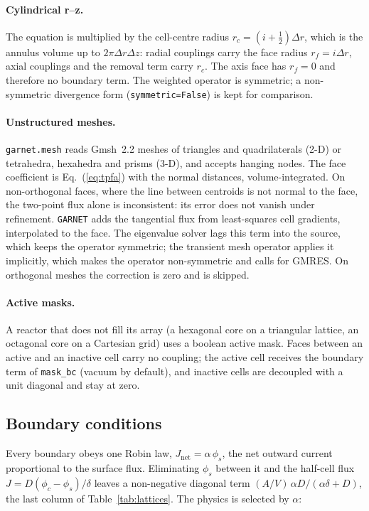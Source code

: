 \documentclass[a4paper,10pt]{article}
\newcommand{\garnet}{\texttt{GARNET}}
\newcommand{\code}[1]{\texttt{#1}}
\begin{document}
\paragraph{Cylindrical r--z.} The equation is multiplied by the cell-centre radius
$r_c = (i+\frac12)\Delta r$, which is the annulus volume up to $2\pi\Delta r\Delta z$:
radial couplings carry the face radius $r_f = i\Delta r$, axial couplings and the
removal term carry $r_c$. The axis face has $r_f = 0$ and therefore no
boundary term. The weighted operator is symmetric; a non-symmetric divergence form
(\code{symmetric=False}) is kept for comparison.

\paragraph{Unstructured meshes.} \code{garnet.mesh} reads Gmsh~2.2 meshes of
triangles and quadrilaterals (2-D) or tetrahedra, hexahedra and prisms (3-D), and
accepts hanging nodes. The face coefficient is Eq.~(\ref{eq:tpfa}) with the
normal distances, volume-integrated. On non-orthogonal faces, where the line
between centroids is not normal to the face, the two-point flux alone is
inconsistent: its error does not vanish under refinement. \garnet{} adds the
tangential flux from least-squares cell gradients, interpolated to the face. The
eigenvalue solver lags this term into the source, which keeps the operator
symmetric; the transient mesh operator applies it implicitly, which makes the
operator non-symmetric and calls for GMRES. On orthogonal meshes the correction
is zero and is skipped.

\paragraph{Active masks.} A reactor that does not fill its array (a hexagonal core
on a triangular lattice, an octagonal core on a Cartesian grid) uses a boolean
active mask. Faces between an active and an inactive cell carry no coupling; the
active cell receives the boundary term of \code{mask\_bc} (vacuum by default),
and inactive cells are decoupled with a unit diagonal and stay at zero.

\subsection{Boundary conditions}
\label{sec:bc}

Every boundary obeys one Robin law, $J_\mathrm{net} = \alpha\,\phi_s$, the net
outward current proportional to the surface flux. Eliminating $\phi_s$ between it
and the half-cell flux $J = D(\phi_c - \phi_s)/\delta$ leaves a non-negative
diagonal term $(A/V)\,\alpha D/(\alpha\delta + D)$, the last column of
Table~\ref{tab:lattices}. The physics is selected by $\alpha$:
\end{document}
